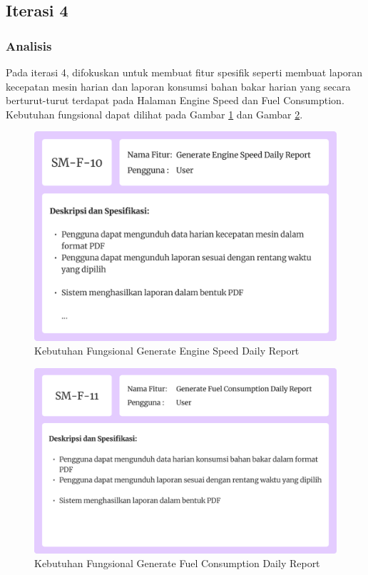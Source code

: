 \subsection{Iterasi 4}

\subsubsection{Analisis}

Pada iterasi 4, difokuskan untuk membuat fitur spesifik seperti membuat laporan kecepatan mesin harian dan laporan konsumsi bahan bakar harian yang secara berturut-turut terdapat pada Halaman Engine Speed dan Fuel Consumption. Kebutuhan fungsional dapat dilihat pada Gambar \ref{fig:fr-generate-es-report} dan Gambar \ref{fig:fr-generate-fuel-report}.

\begin{figure}[!h]
    \includegraphics[width=.8\linewidth, center]{images/hasil/iterations/4/fr-generate-es-report.png}
    \caption{Kebutuhan Fungsional Generate Engine Speed Daily Report}
    \label{fig:fr-generate-es-report}
\end{figure}

\begin{figure}[!h]
    \includegraphics[width=.8\linewidth, center]{images/hasil/iterations/4/fr-generate-fuel-report.png}
    \caption{Kebutuhan Fungsional Generate Fuel Consumption Daily Report}
    \label{fig:fr-generate-fuel-report}
\end{figure}

